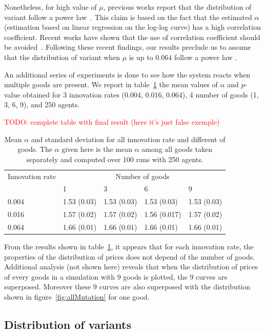 \documentclass{wscpaperproc}
\newcommand{\memo}[2]{\textcolor{#1}{#2}}
\newcommand{\todo}[1]{\memo{red}{TODO: #1\\}}
\begin{document}
Nonetheless, for high value of $\mu$, previous works report that the distribution of variant follow a power law~\cite{bentley_random_2004}. This claim is based on the fact that the estimated $\alpha$ (estimation based on linear regression on the log-log curve) has a high correlation coefficient. Recent works have shown that the use of correlation coefficient should be avoided~\cite{clauset2009powerlawdistributionsinempiricaldat}. Following these recent findings, our results preclude us to assume that the distribution of variant when $\mu$ is up to $0.064$ follow a power law . 

An additional series of experiments is done to see how the system reacts when multiple goods are present. We report in table~\ref{tab:multiGoods} the mean values of $\alpha$ and $p$-value obtained for 3 innovation rates (0.004, 0.016, 0.064), 4 number of goods (1, 3, 6, 9), and 250 agents. 

\todo{complete table with final result (here it's just false exemple)}
\begin{table}[!h]
	\centering
	\begin{tabular}{l|llll}
		Innovation rate &\multicolumn{4}{c}{Number of goods}\\
		      & 1   & 3   &  6 & 9  \\\hline
		0.004 &1.53 (0.03)  &1.53 (0.03)&1.53 (0.03)&1.53 (0.03) \\
		0.016 &1.57 (0.02)  &1.57 (0.02)&1.56 (0.017)&1.57 (0.02) \\
		0.064 &1.66 (0.01)  &1.66 (0.01)&1.66 (0.01)&1.66 (0.01) \\\hline
	\end{tabular}
	\caption{Mean $\alpha$ and standard deviation for all innovation rate and different  of goods. The $\alpha$ given here is the mean $\alpha$ among all goods taken separately and computed over 100 runs with 250 agents.}
	\label{tab:multiGoods}
\end{table}

From the results shown in table~\ref{tab:multiGoods}, it appears that for each innovation rate, the properties of the distribution of prices does not depend of the number of goods. Additional analysis (not shown here) reveals that when the distribution of prices of every goods in a simulation with 9 goods is plotted, the 9 curves are superposed. Moreover these 9 curves are also superposed with the distribution shown in figure~\ref{fig:allMutation} for one good.


\subsection{Distribution of variants}
\end{document}

